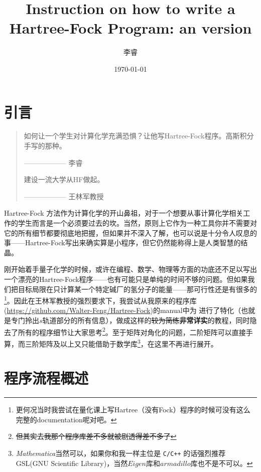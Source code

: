 \documentclass[12pt,a4paper,openany,twoside]{article}
\title{Instruction on how to write a Hartree-Fock Program: an \ce{H2} version}
\author{李睿}
\date{\today}
\numberwithin{equation}{section}
\begin{document}
        \maketitle

        \section{引言}
            \begin{quote}
                如何让一个学生对计算化学充满恐惧？让他写Hartree-Fock程序。高斯积分手写的那种。
                \begin{flushright}
                    —————— 李睿
                \end{flushright}

                建设一流大学从HF做起。
                
                \begin{flushright}
                    —————— 王林军教授
                \end{flushright}
            \end{quote}

            Hartree-Fock 方法作为计算化学的开山鼻祖，对于一个想要从事计算化学相关工作的学生而言是一个必须要过去的坎。当然，原则上它作为一种工具你并不需要对它的所有细节都要彻底地把握，但如果并不深入了解，也可以说是十分令人叹息的事——Hartree-Fock写出来确实算是小程序，但它仍然能称得上是人类智慧的结晶。

            刚开始着手量子化学的时候，或许在编程、数学、物理等方面的功底还不足以写出一个漂亮的Hartree-Fock程序——也有可能只是单纯的时间不够的问题。但如果我们把目标局限在只计算某一个特定碱厂的氢分子的能量——那可行性还是有很多的\footnote{更何况当时我尝试在量化课上写Hartree（没有Fock）程序的时候可没有这么完整的documentation呢对吧。}。因此在王林军教授的强烈要求下，我尝试从我原来的程序库(\url{https://github.com/Walter-Feng/Hartree-Fock})的manual中为  进行了特化（也就是专门拎出$s$轨道部分的所有信息），做成这样的\sout{较为简练}\textbf{非常详实}的教程，同时隐去了所有的程序细节让大家思考\footnote{\sout{但其实去我那个程序库差不多就被剧透得差不多了}}。至于矩阵对角化的问题，二阶矩阵可以直接手算，而三阶矩阵及以上又只能借助于数学库\footnote{\emph{Mathematica}当然可以，如果你和我一样主位是 \lstinline$C/C++$ 的话强烈推荐GSL(GNU Scientific Library)，当然$Eigen$库和$armadillo$库也不是不可以。}，在这里不再进行展开。

        \section{程序流程概述}
\end{document}
